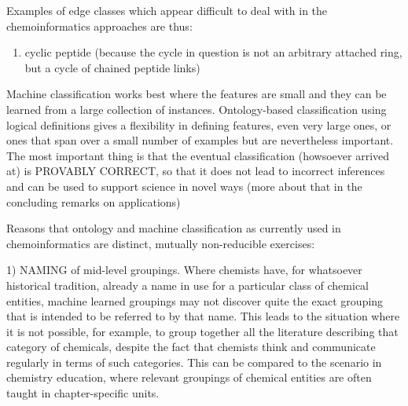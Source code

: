 \documentclass[10pt]{bmc_article}
\newenvironment{bmcformat}{\baselineskip20pt\sloppy\setboolean{publ}{false}}{\baselineskip20pt\sloppy}
\begin{document}
\begin{bmcformat}
Examples of edge classes which appear difficult to deal with in the chemoinformatics approaches are thus:
\begin{enumerate}
	\item cyclic peptide (because the cycle in question is not an arbitrary attached ring, but a cycle of chained peptide links)
\end{enumerate}


Machine classification works best where the features are small and they can be learned from a large collection of instances.  Ontology-based classification using logical definitions gives a flexibility in defining features, even very large ones, or ones that span over a small number of examples but are nevertheless important.  The most important thing is that the eventual classification (howsoever arrived at) is PROVABLY CORRECT, so that it does not lead to incorrect inferences and can be used to support science in novel ways (more about that in the concluding remarks on applications)


Reasons that ontology and machine classification as currently used in chemoinformatics are distinct, mutually non-reducible exercises:  

1) NAMING of mid-level groupings. Where chemists have, for whatsoever historical tradition, already a name in use for a particular class of chemical entities, machine learned groupings may not discover quite the exact grouping that is intended to be referred to by that name. This leads to the situation where it is not possible, for example, to group together all the literature describing that category of chemicals, despite the fact that chemists think and communicate regularly in terms of such categories.  This can be compared to the scenario in chemistry education, where relevant groupings of chemical entities are often taught in chapter-specific units. %


\end{bmcformat}
\end{document}

